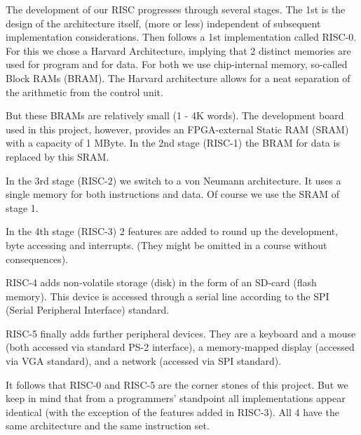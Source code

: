 The development of our RISC progresses through several stages. The 1st is the design of the
architecture itself, (more or less) independent of subsequent implementation considerations. Then
follows a 1st implementation called RISC-0. For this we chose a Harvard Architecture, implying that
2 distinct memories are used for program and for data. For both we use chip-internal memory, so-called
Block RAMs (BRAM). The Harvard architecture allows for a neat separation of the arithmetic from the
control unit.

But these BRAMs are relatively small (1 - 4K words). The development board used in this project,
however, provides an FPGA-external Static RAM (SRAM) with a capacity of 1 MByte. In the 2nd stage
(RISC-1) the BRAM for data is replaced by this SRAM.

In the 3rd stage (RISC-2) we switch to a von Neumann architecture. It uses a single memory for
both instructions and data. Of course we use the SRAM of stage 1.

In the 4th stage (RISC-3) 2 features are added to round up the development, byte accessing and
interrupts. (They might be omitted in a course without consequences).

RISC-4 adds non-volatile storage (disk) in the form of an SD-card (flash memory). This device is
accessed through a serial line according to the SPI (Serial Peripheral Interface) standard.

RISC-5 finally adds further peripheral devices. They are a keyboard and a mouse (both accessed
via standard PS-2 interface), a memory-mapped display (accessed via VGA standard), and a network
(accessed via SPI standard).

It follows that RISC-0 and RISC-5 are the corner stones of this project. But we keep in mind that
from a programmers’ standpoint all implementations appear identical (with the exception of the
features added in RISC-3). All 4 have the same architecture and the same instruction set.
